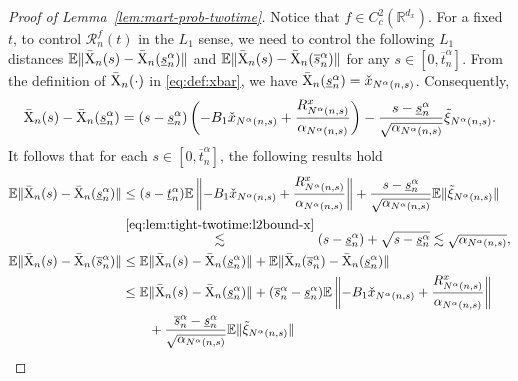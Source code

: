 \documentclass[11pt]{article}
\theoremstyle{plain}
\theoremstyle{definition}
\def\RM{{\mathcal R}}
\def\RB{{\mathbb R}}
\def\EB{{\mathbb E}}
\newcommand{\xcheck}{{\check{x}}}
\newcommand{\xbar}{{\bar{\textnormal{X}}}}
\begin{document}
\begin{appendix}
\begin{proof}[Proof of Lemma~\ref{lem:mart-prob-twotime}]
    Notice that  $f \in C_c^2(\RB^{d_x})$.
    For a fixed $t$,
    to control $\RM_{n}^f(t)$ in the $L_1$ sense, we need to control the following $L_1$ distances $\EB \| \xbar_{n}(s) - \xbar_{n}( \underline{s}^\alpha_{n} ) \| $ and  $\EB \| \xbar_{n}(s) - \xbar_{n}( \overline{s}^\alpha_{n} ) \|$ for any $s \in [0,\overline{t}_{n}^\alpha]$. 
    From the definition of $\xbar_{n}(\cdot)$ in \eqref{eq:def:xbar}, we have $\xbar_{n}( \underline{s}^\alpha_{n} ) = \xcheck_{N^\alpha(n,s)}$. Consequently, 
    \begin{align*}
        \xbar_{n}(s) - \xbar_{n}( \underline{s}^\alpha_{n}  )
        = (s - \underline{s}^\alpha_{n} ) \left(- B_1 \xcheck_{N^\alpha(n,s) } + \frac{R^x_{N^\alpha (n,s)} }{ \alpha_{N^\alpha (n,s)} } \right) -  \frac{s - \underline{s}^\alpha_{n}}{ \sqrt{ \alpha_{N^\alpha(n,s)} } }  
        \tilde{\xi}_{N^\alpha(n,s)}. 
    \end{align*}
    It follows that for each $s \in [0, \overline{t}_{n}^\alpha] $, the following results hold
    \begin{align*}
        \EB \| \xbar_{n}(s) - \xbar_{n}( \underline{s}^\alpha_{n} ) \| 
        & \le (s - \underline{t}^\alpha_{n} ) \EB \left\| - B_1 \xcheck_{N^\alpha(n,s) } + \frac{R^x_{N^\alpha (n,s)} }{ \alpha_{N^\alpha (n,s)} } \right\| +  \frac{s - \underline{s}^\alpha_{n}}{ \sqrt{ \alpha_{N^\alpha(n,s)} } }  
        \EB \| \tilde{\xi}_{N^\alpha(n,s)} \| \\
        & \overset{\eqref{eq:lem:tight-twotime:l2bound-x}}{\lesssim} (s - \underline{s}^\alpha_{n} ) + \sqrt{s - \underline{s}^\alpha_{n} } 
        \lesssim \sqrt{ \alpha_{N^\alpha(n,s)} }, \\
        \EB \| \xbar_{n}(s) - \xbar_{n}( \overline{s}^\alpha_{n} ) \| 
        & \le \EB \| \xbar_{n}(s) - \xbar_{n}( \underline{s}^\alpha_{n} ) \| + \EB \| \xbar_{n}( \overline{s}^\alpha_{n} ) - \xbar_{n}( \underline{s}^\alpha_{n} ) \| \\
        & \le \EB \| \xbar_{n}(s) - \xbar_{n}( \underline{s}^\alpha_{n} ) \| + ( \overline{s}^\alpha_{n} - \underline{s}^\alpha_{n} ) \EB \left\| - B_1 \xcheck_{N^\alpha(n,s) } + \frac{R^x_{N^\alpha (n,s)} }{ \alpha_{N^\alpha (n,s)} } \right\| \\
        & \qquad +  \frac{ \overline{s}^\alpha_{n} - \underline{s}^\alpha_{n}}{ \sqrt{ \alpha_{N^\alpha(n,s)} } }  
        \EB \| \tilde{\xi}_{N^\alpha(n,s)} \| \\

\end{align*}
\end{proof}
\end{appendix}
\end{document}

